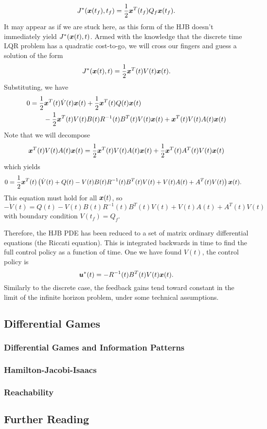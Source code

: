 \begin{equation}
    J^*(\bm{x}(t_f),t_f) = \frac{1}{2} \bm{x}^T(t_f) Q_f \bm{x}(t_f).
\end{equation}
It may appear as if we are stuck here, as this form of the HJB doesn't immediately yield $J^*(\bm{x}(t),t)$. Armed with the knowledge that the discrete time LQR problem has a quadratic cost-to-go, we will cross our fingers and guess a solution of the form
\begin{equation}
    J^*(\bm{x}(t),t) = \frac{1}{2} \bm{x}^T(t) V(t) \bm{x}(t).
\end{equation}
Substituting, we have
\begin{align}
    0 &= \frac{1}{2} \bm{x}^T(t) \dot{V}(t) \bm{x}(t) + \frac{1}{2} \bm{x}^T(t) Q(t) \bm{x}(t)\\ 
    &\qquad- \frac{1}{2} \bm{x}^T(t) V(t) B(t) R^{-1}(t) B^T(t) V(t) \bm{x}(t) + \bm{x}^T(t) V(t) A(t) \bm{x}(t)\nonumber
\end{align}
Note that we will decompose
\begin{equation}
    \bm{x}^T(t) V(t) A(t) \bm{x}(t) = \frac{1}{2} \bm{x}^T(t) V(t) A(t) \bm{x}(t) + \frac{1}{2} \bm{x}^T(t) A^T(t) V(t) \bm{x}(t)
\end{equation}
which yields
\begin{align}
    0 &= \frac{1}{2} \bm{x}^T(t) \left(\dot{V}(t) + Q(t) - V(t) B(t) R^{-1}(t) B^T(t) V(t) + V(t) A(t) + A^T(t) V(t)\right) \bm{x}(t).
\end{align}
This equation must hold for all $\bm{x}(t)$, so 
\begin{equation}
    -\dot{V}(t) = Q(t) - V(t) B(t) R^{-1}(t) B^T(t) V(t) + V(t) A(t) + A^T(t) V(t)
\end{equation}
with boundary condition $V(t_f) = Q_f$.

Therefore, the HJB PDE has been reduced to a set of matrix ordinary differential equations (the Riccati equation). This is integrated backwards in time to find the full control policy as a function of time. One we have found $V(t)$, the control policy is
\begin{equation}
    \bm{u}^*(t) = - R^{-1}(t) B^T(t) V(t) \bm{x}(t).
\end{equation}
Similarly to the discrete case, the feedback gains tend toward constant in the limit of the infinite horizon problem, under some technical assumptions.

\subsection{Differential Games}



\subsubsection{Differential Games and Information Patterns}

\subsubsection{Hamilton-Jacobi-Isaacs}

\subsubsection{Reachability}


\subsection{Further Reading}
